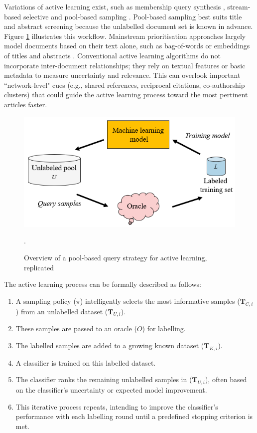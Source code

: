 \documentclass[10pt, english]{article}
\begin{document}
Variations of active learning exist, such as membership query synthesis \cite{angluin_queries_1988}, stream-based selective \cite{akinseloyin_novel_2024} and pool-based sampling \cite{lewis_sequential_1994}. 
Pool-based sampling best suits title and abstract screening because the unlabelled document set is known in advance. Figure \ref{fig:pool_based_query} illustrates this workflow. Mainstream prioritisation approaches largely model documents based on their text alone, such as bag-of-words or embeddings of titles and abstracts \cite{diao_lexical_2021}. Conventional active learning algorithms do not incorporate inter-document relationships; they rely on textual features or basic metadata to measure uncertainty and relevance. This can overlook important ``network-level" cues (e.g., shared references, reciprocal citations, co-authorship clusters) that could guide the active learning process toward the most pertinent articles faster.


\begin{figure}
\centering
\includegraphics[width=0.5\linewidth]{images/pool_based_strategy.png}
\caption{Overview of a pool-based query strategy for active learning, replicated\cite{ren_survey_2021}}.
\label{fig:pool_based_query}
\end{figure}


The active learning process can be formally described as follows:

\begin{enumerate}
    \item A sampling policy ($\pi$) intelligently selects the most informative samples ($\mathbf{T}_{C,i}$) from an unlabelled dataset ($\mathbf{T}_{U,i}$).
    \item These samples are passed to an oracle ($O$) for labelling.
    \item The labelled samples are added to a growing known dataset ($\mathbf{T}_{K,i}$).
    \item A classifier is trained on this labelled dataset.
    \item The classifier ranks the remaining unlabelled samples in ($\mathbf{T}_{U,i}$), often based on the classifier's uncertainty or expected model improvement.
    \item This iterative process repeats, intending to improve the classifier's performance with each labelling round until a predefined stopping criterion is met.
\end{enumerate}
\end{document}
